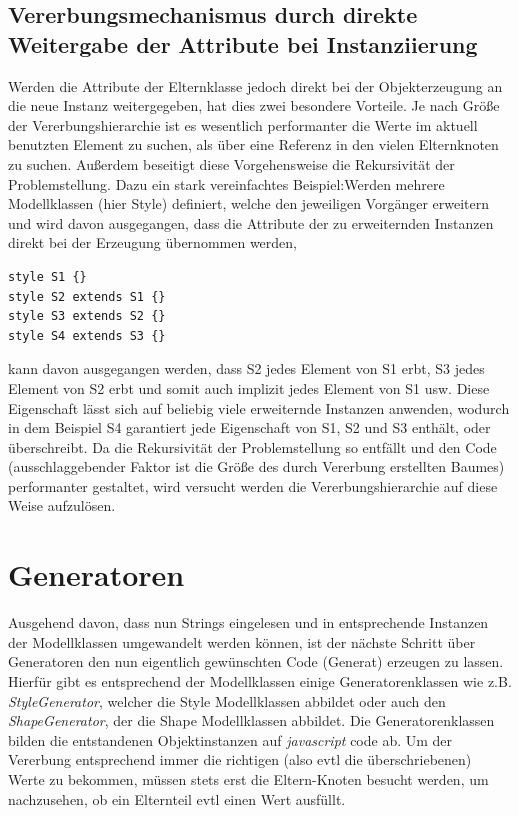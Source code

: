 \subsection{Vererbungsmechanismus durch direkte Weitergabe der Attribute bei Instanziierung}
Werden die Attribute der Elternklasse jedoch direkt bei der Objekterzeugung an die neue Instanz weitergegeben, hat dies zwei besondere Vorteile. Je nach Größe der Vererbungshierarchie ist es wesentlich performanter die Werte im aktuell benutzten Element zu suchen, als über eine Referenz in den vielen Elternknoten zu suchen. Außerdem beseitigt diese Vorgehensweise die Rekursivität der Problemstellung. Dazu ein stark vereinfachtes Beispiel:\linebreak Werden mehrere Modellklassen (hier Style) definiert, welche den jeweiligen Vorgänger erweitern und wird davon ausgegangen, dass die Attribute der zu erweiternden Instanzen direkt bei der Erzeugung übernommen werden,
\begin{lstlisting}[style=spray]
style S1 {}
style S2 extends S1 {}
style S3 extends S2 {}
style S4 extends S3 {}
\end{lstlisting}kann davon ausgegangen werden, dass S2 jedes Element von S1 erbt, S3 jedes Element von S2 erbt und somit auch implizit jedes Element von S1 usw. Diese Eigenschaft lässt sich auf beliebig viele erweiternde Instanzen anwenden, wodurch in dem Beispiel S4 garantiert jede Eigenschaft von S1, S2 und S3 enthält, oder überschreibt. Da die Rekursivität der Problemstellung so entfällt und den Code (ausschlaggebender Faktor ist die Größe des durch Vererbung erstellten Baumes) performanter gestaltet, wird versucht werden die Vererbungshierarchie auf diese Weise aufzulösen.

\section{Generatoren}Ausgehend davon, dass nun Strings eingelesen und in entsprechende Instanzen der Modellklassen umgewandelt werden können, ist der nächste Schritt über Generatoren den nun eigentlich gewünschten Code (Generat) erzeugen zu lassen. Hierfür gibt es entsprechend der Modellklassen einige Generatorenklassen wie z.B. \textit{StyleGenerator}, welcher die Style Modellklassen abbildet oder auch den \textit{ShapeGenerator}, der die Shape Modellklassen abbildet. Die Generatorenklassen bilden die entstandenen Objektinstanzen auf \textit{javascript} code ab. Um der Vererbung entsprechend immer die richtigen (also evtl die überschriebenen) Werte zu bekommen, müssen stets erst die Eltern-Knoten besucht werden, um nachzusehen, ob ein Elternteil evtl einen Wert ausfüllt.

